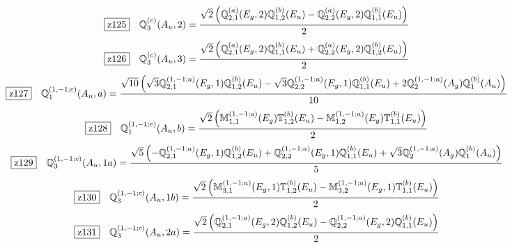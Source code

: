 \documentclass[fleqn,10pt,landscape]{jsarticle}
\begin{document}
\begin{dmath*}
\hspace*{3mm}\fbox{z125}\quad \mathbb{Q}_{3}^{(c)}(A_{u},2)=\frac{\sqrt{2} \left(\mathbb{Q}_{2,1}^{(a)}(E_{g},2) \mathbb{Q}_{1,2}^{(b)}(E_{u}) - \mathbb{Q}_{2,2}^{(a)}(E_{g},2) \mathbb{Q}_{1,1}^{(b)}(E_{u})\right)}{2}
\end{dmath*}
\begin{dmath*}
\hspace*{3mm}\fbox{z126}\quad \mathbb{Q}_{3}^{(c)}(A_{u},3)=\frac{\sqrt{2} \left(\mathbb{Q}_{2,1}^{(a)}(E_{g},2) \mathbb{Q}_{1,1}^{(b)}(E_{u}) + \mathbb{Q}_{2,2}^{(a)}(E_{g},2) \mathbb{Q}_{1,2}^{(b)}(E_{u})\right)}{2}
\end{dmath*}
\begin{dmath*}
\hspace*{3mm}\fbox{z127}\quad \mathbb{Q}_{1}^{(1,-1;c)}(A_{u},a)=\frac{\sqrt{10} \left(\sqrt{3} \mathbb{Q}_{2,1}^{(1,-1;a)}(E_{g},1) \mathbb{Q}_{1,2}^{(b)}(E_{u}) - \sqrt{3} \mathbb{Q}_{2,2}^{(1,-1;a)}(E_{g},1) \mathbb{Q}_{1,1}^{(b)}(E_{u}) + 2 \mathbb{Q}_{2}^{(1,-1;a)}(A_{g}) \mathbb{Q}_{1}^{(b)}(A_{u})\right)}{10}
\end{dmath*}
\begin{dmath*}
\hspace*{3mm}\fbox{z128}\quad \mathbb{Q}_{1}^{(1,-1;c)}(A_{u},b)=\frac{\sqrt{2} \left(\mathbb{M}_{1,1}^{(1,-1;a)}(E_{g}) \mathbb{T}_{1,2}^{(b)}(E_{u}) - \mathbb{M}_{1,2}^{(1,-1;a)}(E_{g}) \mathbb{T}_{1,1}^{(b)}(E_{u})\right)}{2}
\end{dmath*}
\begin{dmath*}
\hspace*{3mm}\fbox{z129}\quad \mathbb{Q}_{3}^{(1,-1;c)}(A_{u},1a)=\frac{\sqrt{5} \left(- \mathbb{Q}_{2,1}^{(1,-1;a)}(E_{g},1) \mathbb{Q}_{1,2}^{(b)}(E_{u}) + \mathbb{Q}_{2,2}^{(1,-1;a)}(E_{g},1) \mathbb{Q}_{1,1}^{(b)}(E_{u}) + \sqrt{3} \mathbb{Q}_{2}^{(1,-1;a)}(A_{g}) \mathbb{Q}_{1}^{(b)}(A_{u})\right)}{5}
\end{dmath*}
\begin{dmath*}
\hspace*{3mm}\fbox{z130}\quad \mathbb{Q}_{3}^{(1,-1;c)}(A_{u},1b)=\frac{\sqrt{2} \left(\mathbb{M}_{3,1}^{(1,-1;a)}(E_{g},1) \mathbb{T}_{1,2}^{(b)}(E_{u}) - \mathbb{M}_{3,2}^{(1,-1;a)}(E_{g},1) \mathbb{T}_{1,1}^{(b)}(E_{u})\right)}{2}
\end{dmath*}
\begin{dmath*}
\hspace*{3mm}\fbox{z131}\quad \mathbb{Q}_{3}^{(1,-1;c)}(A_{u},2a)=\frac{\sqrt{2} \left(\mathbb{Q}_{2,1}^{(1,-1;a)}(E_{g},2) \mathbb{Q}_{1,2}^{(b)}(E_{u}) - \mathbb{Q}_{2,2}^{(1,-1;a)}(E_{g},2) \mathbb{Q}_{1,1}^{(b)}(E_{u})\right)}{2}
\end{dmath*}
\end{document}
